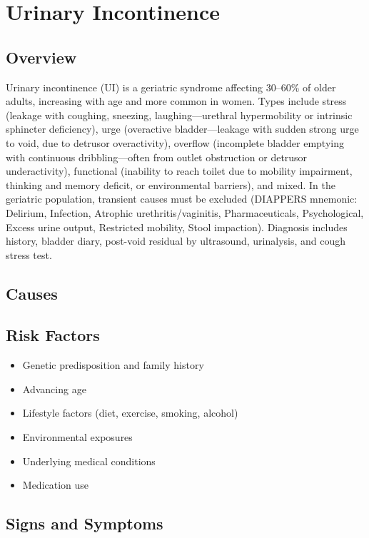 \chapter{Urinary Incontinence}
\label{sec:geriatric:Urinary Incontinence}

\section{Overview}
Urinary incontinence (UI) is a geriatric syndrome affecting 30--60\% of older adults, increasing with age and more common in women. Types include stress (leakage with coughing, sneezing, laughing---urethral hypermobility or intrinsic sphincter deficiency), urge (overactive bladder---leakage with sudden strong urge to void, due to detrusor overactivity), overflow (incomplete bladder emptying with continuous dribbling---often from outlet obstruction or detrusor underactivity), functional (inability to reach toilet due to mobility impairment, thinking and memory deficit, or environmental barriers), and mixed. In the geriatric population, transient causes must be excluded (DIAPPERS mnemonic: Delirium, Infection, Atrophic urethritis/vaginitis, Pharmaceuticals, Psychological, Excess urine output, Restricted mobility, Stool impaction). Diagnosis includes history, bladder diary, post-void residual by ultrasound, urinalysis, and cough stress test.
\section{Causes}
\section{Risk Factors}

\begin{itemize}[noitemsep]
  \item Genetic predisposition and family history
  \item Advancing age
  \item Lifestyle factors (diet, exercise, smoking, alcohol)
  \item Environmental exposures
  \item Underlying medical conditions
  \item Medication use
\end{itemize}
\section{Signs and Symptoms}

